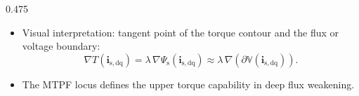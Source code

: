 \begin{frame}
\begin{columns}
\begin{column}{0.475\textwidth}
\begin{itemize}
                \item<3-> Visual interpretation: tangent point of the torque contour and the flux or voltage boundary:
                      $$
                          \nabla T(\bm{i}_{\mathrm{s,dq}})=\lambda\,\nabla\Psi_{\mathrm s}(\bm{i}_{\mathrm{s,dq}})
                          \approx \lambda\,\nabla(\partial\mathbb{V}(\bm{i}_{\mathrm{s,dq}})).
                      $$
                \item<4-> The MTPF locus defines the upper torque capability in deep flux weakening.
            \end{itemize}
        \end{column}
    \end{columns}
\end{frame}



